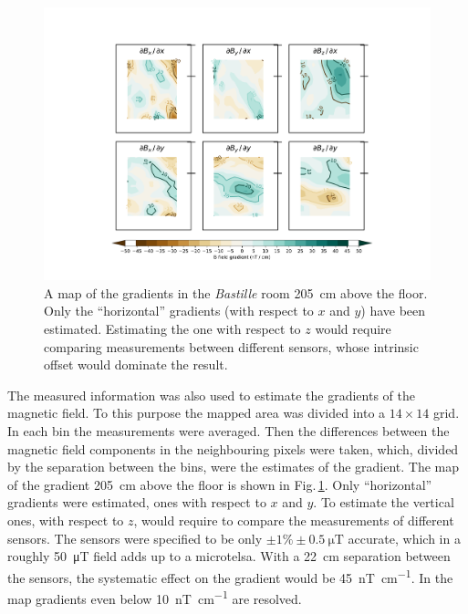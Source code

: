 \begin{figure}
  \centering
  \includegraphics[width=\linewidth]{gfx/mapping/lpsc/bastille_crane_away_rep_gradient_205cm_crop.pdf}
  \caption{A map of the gradients in the \emph{Bastille} room \SI{205}{\centi\metre} above the floor. Only the ``horizontal'' gradients (with respect to $x$ and $y$) have been estimated. Estimating the one with respect to $z$ would require comparing measurements between different sensors, whose intrinsic offset would dominate the result.}\label{fig:mapping_bastille_gradient}
\end{figure}

The measured information was also used to estimate the gradients of the magnetic field. To this purpose the mapped area was divided into a $14 \times 14$ grid. In each bin the measurements were averaged.
Then the differences between the magnetic field components in the neighbouring pixels were taken, which, divided by the separation between the bins, were the estimates of the gradient.
The map of the gradient \SI{205}{\centi\metre} above the floor is shown in Fig.\,\ref{fig:mapping_bastille_gradient}.
Only ``horizontal'' gradients were estimated, ones with respect to $x$ and $y$.
To estimate the vertical ones, with respect to $z$, would require to compare the measurements of different sensors. The sensors were specified to be only $\pm 1\% \pm \SI{0.5}{\micro\tesla}$ accurate, which in a roughly \SI{50}{\micro\tesla} field adds up to a microtelsa. With a \SI{22}{\centi\meter} separation between the sensors, the systematic effect on the gradient would be \SI[per-mode=symbol]{45}{\nano\tesla\per\centi\meter}. In the map gradients even below \SI[per-mode=symbol]{10}{\nano\tesla\per\centi\meter} are resolved.

